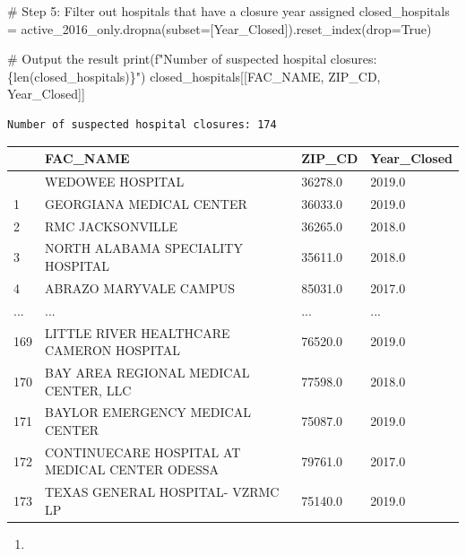 \documentclass[
  letterpaper,
  DIV=11,
  numbers=noendperiod]{scrartcl}
\newenvironment{Shaded}{\begin{snugshade}}{\end{snugshade}}
\newcommand{\BuiltInTok}[1]{\textcolor[rgb]{0.00,0.23,0.31}{#1}}
\newcommand{\CommentTok}[1]{\textcolor[rgb]{0.37,0.37,0.37}{#1}}
\newcommand{\NormalTok}[1]{\textcolor[rgb]{0.00,0.23,0.31}{#1}}
\newcommand{\OperatorTok}[1]{\textcolor[rgb]{0.37,0.37,0.37}{#1}}
\newcommand{\SpecialCharTok}[1]{\textcolor[rgb]{0.37,0.37,0.37}{#1}}
\newcommand{\SpecialStringTok}[1]{\textcolor[rgb]{0.13,0.47,0.30}{#1}}
\newcommand{\StringTok}[1]{\textcolor[rgb]{0.13,0.47,0.30}{#1}}
\newcommand{\VariableTok}[1]{\textcolor[rgb]{0.07,0.07,0.07}{#1}}
\providecommand{\tightlist}{%
  \setlength{\itemsep}{0pt}\setlength{\parskip}{0pt}}\usepackage{longtable,booktabs,array}
\begin{document}
\begin{Shaded}
\begin{Highlighting}[]
\CommentTok{\# Step 5: Filter out hospitals that have a closure year assigned}
\NormalTok{closed\_hospitals }\OperatorTok{=}\NormalTok{ active\_2016\_only.dropna(subset}\OperatorTok{=}\NormalTok{[}\StringTok{\textquotesingle{}Year\_Closed\textquotesingle{}}\NormalTok{]).reset\_index(drop}\OperatorTok{=}\VariableTok{True}\NormalTok{)}

\CommentTok{\# Output the result}
\BuiltInTok{print}\NormalTok{(}\SpecialStringTok{f"Number of suspected hospital closures: }\SpecialCharTok{\{}\BuiltInTok{len}\NormalTok{(closed\_hospitals)}\SpecialCharTok{\}}\SpecialStringTok{"}\NormalTok{)}
\NormalTok{closed\_hospitals[[}\StringTok{\textquotesingle{}FAC\_NAME\textquotesingle{}}\NormalTok{, }\StringTok{\textquotesingle{}ZIP\_CD\textquotesingle{}}\NormalTok{, }\StringTok{\textquotesingle{}Year\_Closed\textquotesingle{}}\NormalTok{]]}
\end{Highlighting}
\end{Shaded}

\begin{verbatim}
Number of suspected hospital closures: 174
\end{verbatim}

\begin{longtable}[]{@{}llll@{}}
\toprule\noalign{}
& FAC\_NAME & ZIP\_CD & Year\_Closed \\
\midrule\noalign{}
\endhead
\bottomrule\noalign{}
\endlastfoot
0 & WEDOWEE HOSPITAL & 36278.0 & 2019.0 \\
1 & GEORGIANA MEDICAL CENTER & 36033.0 & 2019.0 \\
2 & RMC JACKSONVILLE & 36265.0 & 2018.0 \\
3 & NORTH ALABAMA SPECIALITY HOSPITAL & 35611.0 & 2018.0 \\
4 & ABRAZO MARYVALE CAMPUS & 85031.0 & 2017.0 \\
... & ... & ... & ... \\
169 & LITTLE RIVER HEALTHCARE CAMERON HOSPITAL & 76520.0 & 2019.0 \\
170 & BAY AREA REGIONAL MEDICAL CENTER, LLC & 77598.0 & 2018.0 \\
171 & BAYLOR EMERGENCY MEDICAL CENTER & 75087.0 & 2019.0 \\
172 & CONTINUECARE HOSPITAL AT MEDICAL CENTER ODESSA & 79761.0 &
2017.0 \\
173 & TEXAS GENERAL HOSPITAL- VZRMC LP & 75140.0 & 2019.0 \\
\end{longtable}

\begin{enumerate}
\def\labelenumi{\arabic{enumi}.}
\setcounter{enumi}{1}
\tightlist
\item
\end{enumerate}
\end{document}
